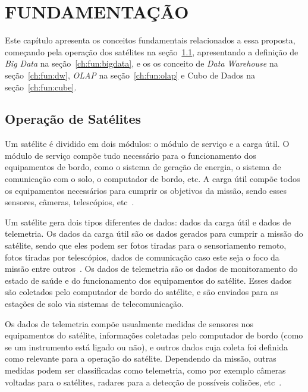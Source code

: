 
\chapter{FUNDAMENTAÇÃO}\label{ch:fun}

Este capítulo apresenta os conceitos fundamentais relacionados a essa proposta, começando pela operação dos satélites na seção~\ref{ch:fun:operations}, apresentando a definição de \textit{Big Data} na seção~\ref{ch:fun:bigdata}, e os os conceito de \textit{Data Warehouse} na seção~\ref{ch:fun:dw}, \textit{OLAP} na seção~\ref{ch:fun:olap} e Cubo de Dados na seção~\ref{ch:fun:cube}.

\section{Operação de Satélites}\label{ch:fun:operations}

Um satélite é dividido em dois módulos: o módulo de serviço e a carga útil.
O módulo de serviço compõe tudo necessário para o funcionamento dos equipamentos de bordo, como o sistema de geração de energia, o sistema de comunicação com o solo, o computador de bordo, etc.
A carga útil compõe todos os equipamentos necessários para cumprir os objetivos da missão, sendo esses sensores, câmeras, telescópios, etc~\cite{larsonSpaceMissionAnalysis1999}.

Um satélite gera dois tipos diferentes de dados: dados da carga útil e dados de telemetria.
Os dados da carga útil são os dados gerados para cumprir a missão do satélite, sendo que eles podem ser fotos tiradas para o sensoriamento remoto, fotos tiradas por telescópios, dados de comunicação caso este seja o foco da missão entre outros~\cite{larsonSpaceMissionAnalysis1999}.
Os dados de telemetria são os dados de monitoramento do estado de saúde e do funcionamento dos equipamentos do satélite.
Esses dados são coletados pelo computador de bordo do satélite, e são enviados para as estações de solo via sistemas de telecomunicação.

Os dados de telemetria compõe usualmente medidas de sensores nos equipamentos do satélite, informações coletadas pelo computador de bordo (como se um instrumento está ligado ou não), e outros dados cuja coleta foi definida como relevante para a operação do satélite.
Dependendo da missão, outras medidas podem ser classificadas como telemetria, como por exemplo câmeras voltadas para o satélites, radares para a detecção de possíveis colisões, etc~\cite{kragCmSpaceDebris2017}.

